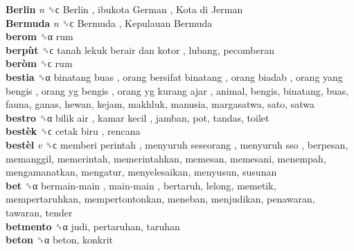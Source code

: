 \textbf{Berlin} \emph{n}  ␝ϲ   Berlin ,  ibukota German ,  Kota di Jerman   \\
\textbf{Bermuda} \emph{n}  ␝ϲ   Bermuda ,  Kepulauan Bermuda   \\
\textbf{berom} ␝α  rum  \\
\textbf{berpùt} ␝ϲ   tanah lekuk berair dan kotor , lubang, pecomberan  \\
\textbf{beròm} ␝ϲ  rum  \\
\textbf{bestia} ␝α   binatang buas ,  orang bersifat binatang ,  orang biadab ,  orang yang bengis ,  orang yg bengis ,  orang yg kurang ajar , animal, bengis, binatang, buas, fauna, ganas, hewan, kejam, makhluk, manusia, margasatwa, sato, satwa  \\
\textbf{bestro} ␝α   bilik air ,  kamar kecil , jamban, pot, tandas, toilet  \\
\textbf{bestèk} ␝ϲ   cetak biru , rencana  \\
\textbf{bestèl} \emph{v}  ␝ϲ   memberi perintah ,  menyuruh seseorang ,  menyuruh sso , berpesan, memanggil, memerintah, memerintahkan, memesan, memesani, menempah, mengamanatkan, mengatur, menyelesaikan, menyusun, susunan  \\
\textbf{bet} ␝α   bermain-main ,  main-main , bertaruh, lelong, memetik, mempertaruhkan, mempertontonkan, meneban, menjudikan, penawaran, tawaran, tender  \\
\textbf{betmento} ␝α  judi, pertaruhan, taruhan  \\
\textbf{beton} ␝α  beton, konkrit  \\
